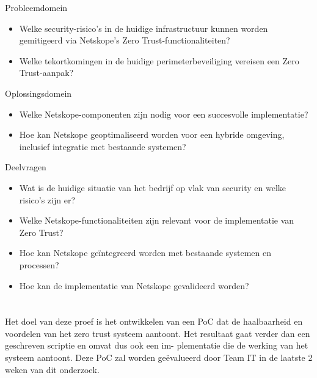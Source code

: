 Probleemdomein
\begin{itemize}
  \item Welke security-risico’s in de huidige infrastructuur kunnen worden gemitigeerd via Netskope’s Zero Trust-functionaliteiten?
  \item Welke tekortkomingen in de huidige perimeterbeveiliging vereisen een Zero Trust-aanpak?
\end{itemize}

Oplossingsdomein
\begin{itemize}
  \item Welke Netskope-componenten zijn nodig voor een succesvolle implementatie?
  \item Hoe kan Netskope geoptimaliseerd worden voor een hybride omgeving, inclusief integratie met bestaande systemen?
\end{itemize}

Deelvragen
\begin{itemize}
  \item Wat is de huidige situatie van het bedrijf op vlak van security en welke risico’s zijn er?
  \item Welke Netskope-functionaliteiten zijn relevant voor de implementatie van Zero Trust?
  \item Hoe kan Netskope geïntegreerd worden met bestaande systemen en processen?
  \item Hoe kan de implementatie van Netskope gevalideerd worden?
\end{itemize}

\section{}%
\label{sec:onderzoeksdoelstelling}


Het doel van deze proef is het ontwikkelen van een PoC dat de haalbaarheid en
voordelen van het zero trust systeem aantoont.
Het resultaat gaat verder dan een geschreven scriptie en omvat dus ook een im-
plementatie die de werking van het systeem aantoont. Deze PoC zal
worden geëvalueerd door Team IT in de laatste 2 weken van dit onderzoek.

\section{}%
\label{sec:opzet-bachelorproef}

